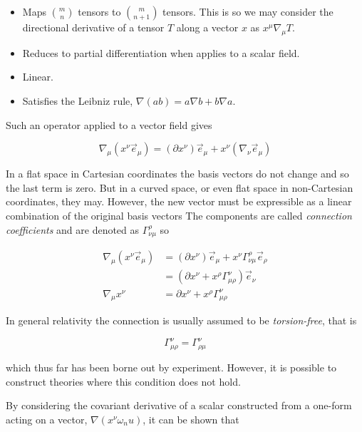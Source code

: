 \begin{itemize}
\item Maps ${m \choose n}$ tensors to ${m \choose {n+1}}$ tensors.
This is so we may consider the directional derivative of a tensor $T$
along a vector $x$ as $x^\mu \nabla_\mu T$.
\item Reduces to partial differentiation when applies to a scalar
field.
\item Linear.
\item Satisfies the Leibniz rule, $\nabla(a b) = a\nabla b + b \nabla a$.
\end{itemize}

Such an operator applied to a vector field gives

\begin{equation*}
\nabla_\mu (x^\nu \vec{e}_\mu)
= (\partial x^\nu) \vec{e}_\mu + x^\nu (\nabla_\nu \vec{e}_\mu)
\end{equation*}

In a flat space in Cartesian coordinates the basis vectors do not
change and so the last term is zero.  But in a curved space, or even
flat space in non-Cartesian coordinates, they may.  However, the new
vector must be expressible as a linear combination of the original
basis vectors  The components are called \emph{connection
coefficients} and are denoted as $\Gamma^\rho_{\nu\mu}$ so

\begin{align}
\label{eq:covariant_derivative}
\nabla_\mu (x^\nu \vec{e}_\mu) &= 
(\partial x^\nu) \vec{e}_\mu + 
x^\nu \Gamma^\rho_{\nu\mu} \vec{e}_\rho \\
&= (\partial x^\nu + x^\rho \Gamma^\nu_{\mu\rho}) \vec{e}_\nu \\
\nabla_\mu x^\nu &= \partial x^\nu + x^\rho \Gamma^\nu_{\mu\rho}
\end{align}

In general relativity the connection is usually assumed to be
\emph{torsion-free}, that is

\begin{equation}
\label{eq:torsion}
 \Gamma^\nu_{\mu\rho} =  \Gamma^\nu_{\rho\mu}
\end{equation}

which thus far has been borne out by experiment.  However, it is
possible to construct theories where this condition does not hold.

By considering the covariant derivative of a scalar constructed from a
one-form acting on a vector, $\nabla (x^\nu \omega_nu)$, it can be shown
that

